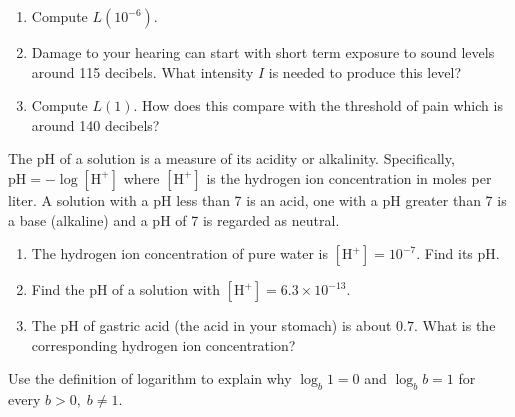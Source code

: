 \documentclass{ximera}
\begin{document}
\begin{problem}
\begin{question}
\begin{enumerate}

\item Compute $L(10^{-6})$.
\item Damage to your hearing can start with short term exposure to sound levels around 115 decibels.  What intensity $I$ is needed to produce this level? 
\item Compute $L(1)$.  How does this compare with the threshold of pain which is around 140 decibels?

\end{enumerate}
\end{question}

\begin{question}\label{pHexercise}
The pH of a solution is a measure of its acidity or alkalinity.  Specifically, $\mbox{pH} = -\log[\mbox{H}^{+}]$ where $[\mbox{H}^{+}]$ is the hydrogen ion concentration in moles per liter.  A solution with a pH less than 7 is an acid, one with a pH greater than 7 is a base (alkaline) and a pH of 7 is regarded as neutral.

\begin{enumerate}

\item The hydrogen ion concentration of pure water is $[\mbox{H}^{+}] = 10^{-7}$.  Find its pH.
\item Find the pH of a solution with $[\mbox{H}^{+}] = 6.3 \times 10^{-13}$.
\item The pH of gastric acid (the acid in your stomach) is about $0.7$.  What is the corresponding hydrogen ion concentration?

\end{enumerate}

\end{question}

\end{problem}

\begin{question}
Use the definition of logarithm to explain why  $\log_{b} 1 = 0$ and $\log_{b} b = 1$ for every $b > 0, \; b \neq 1$.
\end{question}
\end{document}
